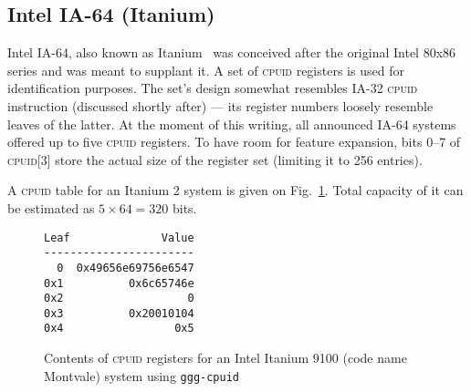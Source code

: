 \documentclass[a4paper,10pt,oneside,unicode]{article}
\newcommand{\cpuid}{\textsc{cpuid} }
\begin{document}
\subsection{Intel IA-64 (Itanium)}

Intel IA-64, also known as Itanium\texttrademark~\cite{itanium-sdm} was conceived after the original Intel 80x86 series and was meant to supplant it. A set of \cpuid registers is used for identification purposes. The set's design somewhat resembles IA-32 \cpuid instruction (discussed shortly after) --- its register numbers loosely resemble leaves of the latter. At the moment of this writing, all announced IA-64 systems offered up to five \cpuid registers. To have room for feature expansion, bits 0--7 of \textsc{cpuid[3]} store the actual size of the register set (limiting it to 256 entries).

A \cpuid table for an Itanium 2 system is given on Fig.~\ref{fig:itanium-cpuid}. Total capacity of it can be estimated as $5 \times 64 = 320$ bits.

\begin{figure}[htbp]
    \centering
\begin{verbatim}
Leaf              Value
-----------------------
  0  0x49656e69756e6547
0x1          0x6c65746e
0x2                   0
0x3          0x20010104
0x4                 0x5
\end{verbatim}
    
\caption{Contents of \cpuid registers for an Intel Itanium 9100 (code name Montvale) system using \texttt{ggg-cpuid}~\cite{ggg-cpuid}}\label{fig:itanium-cpuid}
\end{figure} 

%


\end{document}
